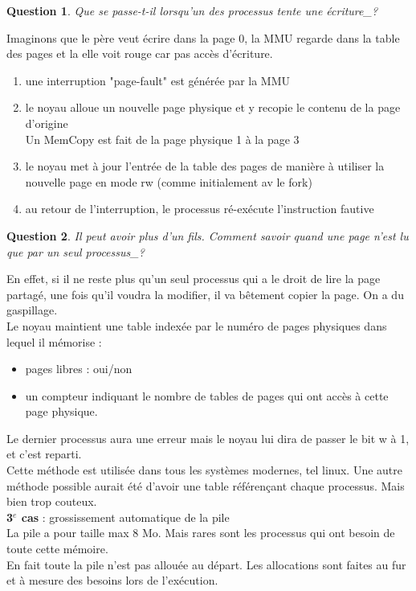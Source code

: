 \documentclass[12pt,a4paper]{report}
\newtheorem*{q}{Question}
\begin{document}
\begin{q} Que se passe-t-il lorsqu'un des processus tente une écriture_? \end{q}
Imaginons que le père veut écrire dans la page 0, la MMU regarde dans la table des pages et la elle voit rouge car pas accès d'écriture.
\begin{enumerate}
\item une interruption "page-fault" est générée par la MMU
\item le noyau alloue un nouvelle page physique et y recopie le contenu de la page d'origine \\
Un MemCopy est fait de la page physique 1 à la page 3
\item le noyau met à jour l'entrée de la table des pages de manière à utiliser la nouvelle page en mode rw (comme initialement av le fork)
\item au retour de l'interruption, le processus ré-exécute l'instruction fautive
\end{enumerate}



\begin{q}Il peut avoir plus d'un fils. Comment savoir quand une page n'est lu que par un seul processus_?\end{q}
En effet, si il ne reste plus qu'un seul processus qui a le droit de lire la page partagé,  une fois qu'il voudra la modifier, il va bêtement copier la page. On a du gaspillage.\\
Le noyau maintient une table indexée par le numéro de pages physiques dans lequel il mémorise :
\begin{itemize}
\item pages libres : oui/non
\item un compteur indiquant le nombre de tables de pages qui ont accès à cette page physique.
\end{itemize}

Le dernier processus aura une erreur mais le noyau lui dira de passer le bit w à 1, et c'est reparti.\\

Cette méthode est utilisée dans tous les systèmes modernes, tel linux.
Une autre méthode possible aurait été d'avoir une table référençant chaque processus. Mais bien trop couteux.\\

\textbf{3$^e$ cas} : grossissement automatique de la pile\\
La pile a pour taille max 8 Mo. Mais rares sont les processus qui ont besoin de toute cette mémoire.\\
En fait toute la pile n'est pas allouée au départ. Les allocations sont faites au fur et à mesure des besoins lors de l'exécution.\\ 
\end{document}
